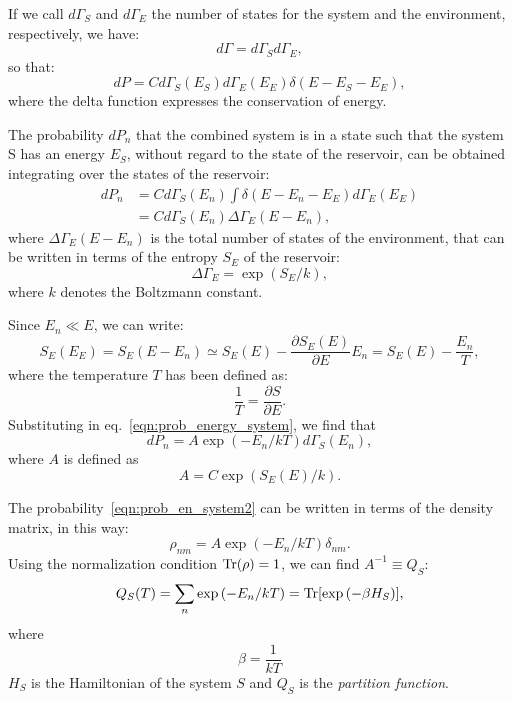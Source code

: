 If we call $d\Gamma_S$ and $d\Gamma_E$ the number of states for the system and the environment, respectively, we have:
\begin{equation}
        d\Gamma = d\Gamma_S d\Gamma_E, 
\end{equation}
so that:
\begin{equation}
    dP = C d\Gamma_S(E_S) d\Gamma_E(E_E) \delta(E-E_S-E_E),
\end{equation}
where the delta function expresses the conservation of energy.

The probability $dP_n$ that the combined system is in a state such that the system S has an energy $E_S$, without regard to the state of the reservoir, can be obtained integrating over the states of the reservoir:
\begin{equation}
\begin{split}
\label{eqn:prob_energy_system}
    dP_n &= Cd\Gamma_S(E_n) \int \delta(E-E_n-E_E) d\Gamma_E(E_E) \\
         &= Cd\Gamma_S(E_n) \Delta\Gamma_E(E-E_n),
\end{split}
\end{equation}
where $\Delta\Gamma_E(E-E_n)$ is the total number of states of the environment, that can be written in terms of the entropy $S_E$ of the reservoir:
\begin{equation*}
    \Delta\Gamma_E = \exp{(S_E/k)},
\end{equation*}
where $k$ denotes the Boltzmann constant.

Since $E_n \ll E$, we can write:
\begin{equation*}
    S_E(E_E) = S_E (E-E_n) \simeq S_E(E) - \frac{\partial S_E(E)}{\partial E} E_n = S_E(E) -\frac{E_n}{T},
\end{equation*}
where the temperature $T$ has been defined as:
\begin{equation*}
    \frac{1}{T} = \frac{\partial S}{\partial E}.
\end{equation*}
Substituting in eq.~\ref{eqn:prob_energy_system}, we find that
\begin{equation}
\label{eqn:prob_en_system2}
    dP_n = A \exp{(-E_n/kT)} d\Gamma_S(E_n),
\end{equation}
where $A$ is defined as
\begin{equation}
    A = C \exp{(S_E(E)/k)}.
\end{equation}

The probability~\ref{eqn:prob_en_system2} can be written in terms of the density matrix, in this way:
\begin{equation*}
    \rho_{nm} = A \exp{(-E_n/kT)} \delta_{nm}.
\end{equation*}
Using the normalization condition $\operatorname{Tr}(\rho) = 1$, we can find $A^{-1} \equiv Q_S$:
\begin{equation*}
    Q_S(T) = \sum_n \exp{(-E_n/kT)} = \operatorname{Tr}[\exp{(-\beta H_S)}],
\end{equation*}
where
\begin{equation*}
    \beta = \frac{1}{kT}
\end{equation*}
$H_S$ is the Hamiltonian of the system $S$ and $Q_S$ is the \emph{partition function}.

